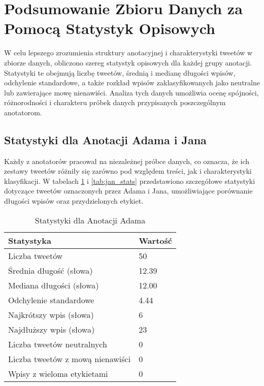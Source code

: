 \documentclass[12pt]{article}
\begin{document}
\section{Podsumowanie Zbioru Danych za Pomocą Statystyk Opisowych}

W celu lepszego zrozumienia struktury anotacyjnej i charakterystyki tweetów w zbiorze danych, obliczono szereg statystyk opisowych dla każdej grupy anotacji. Statystyki te obejmują liczbę tweetów, średnią i medianę długości wpisów, odchylenie standardowe, a także rozkład wpisów zaklasyfikowanych jako neutralne lub zawierające mowę nienawiści. Analiza tych danych umożliwia ocenę spójności, różnorodności i charakteru próbek danych przypisanych poszczególnym anotatorom.

\subsection{Statystyki dla Anotacji Adama i Jana}

Każdy z anotatorów pracował na niezależnej próbce danych, co oznacza, że ich zestawy tweetów różniły się zarówno pod względem treści, jak i charakterystyki klasyfikacji. W tabelach \ref{tab:adam_stats} i \ref{tab:jan_stats} przedstawiono szczegółowe statystyki dotyczące tweetów oznaczonych przez Adama i Jana, umożliwiające porównanie długości wpisów oraz przydzielonych etykiet.

\begin{table}[h]
    \centering
    \caption{Statystyki dla Anotacji Adama}
    \label{tab:adam_stats}
    \begin{tabular}{|l|l|}
        \hline
        Statystyka & Wartość \\ \hline
        Liczba tweetów & 50 \\ \hline
        Średnia długość (słowa) & 12.39 \\ \hline
        Mediana długości (słowa) & 12.00 \\ \hline
        Odchylenie standardowe & 4.44 \\ \hline
        Najkrótszy wpis (słowa) & 6 \\ \hline
        Najdłuższy wpis (słowa) & 23 \\ \hline
        Liczba tweetów neutralnych & 0 \\ \hline
        Liczba tweetów z mową nienawiści & 0 \\ \hline
        Wpisy z wieloma etykietami & 0 \\ \hline
    \end{tabular}
\end{table}
\end{document}
